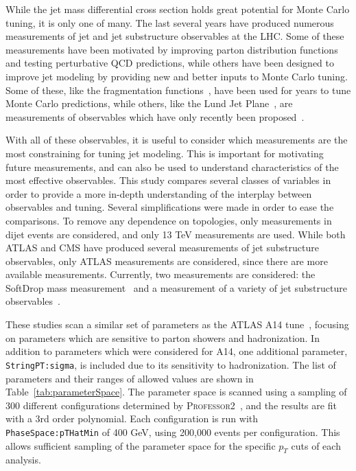 While the jet mass differential cross section holds great potential for Monte Carlo tuning, it is only one of many.  The last several years have produced numerous measurements of jet and jet substructure observables at the LHC. 
Some of these measurements have been motivated by improving parton distribution functions and testing perturbative QCD predictions, 
while others have been designed to improve jet modeling by providing new and better inputs to Monte Carlo tuning.
Some of these, like the fragmentation functions~\cite{Aad:2019onw}, have been used for years to tune Monte Carlo predictions, 
while others, like the Lund Jet Plane~\cite{lundAtlas}, are measurements of observables which have only recently been proposed~\cite{lundPlane}.

With all of these observables, it is useful to consider which measurements are the most constraining for tuning jet modeling.
This is important for motivating future measurements, and can also be used to understand characteristics of the most effective observables.
This study compares several classes of variables in order to provide a more in-depth understanding of the interplay between observables and tuning.
Several simplifications were made in order to ease the comparisons. 
To remove any dependence on topologies, only measurements in dijet events are considered, and only 13 TeV measurements are used.
While both ATLAS and CMS have produced several measurements of jet substructure observables, only ATLAS measurements are considered, since there are more available measurements.
Currently, two measurements are considered: the SoftDrop mass measurement~\cite{Aaboud:2017qwh} and a measurement of a variety of jet substructure observables~\cite{Aaboud:2019aii}.


These studies scan a similar set of parameters as the ATLAS A14 tune~\cite{ATL-PHYS-PUB-2014-021}, focusing on parameters which are sensitive to parton showers and hadronization.
In addition to parameters which were considered for A14, one additional parameter, \texttt{StringPT:sigma}, is included due to its sensitivity to hadronization.
The list of parameters and their ranges of allowed values are shown in Table~\ref{tab:parameterSpace}.
The parameter space is scanned using a sampling of 300 different configurations determined by \textsc{Professor2}~\cite{Buckley:2009bj}, and the results are fit with a 3rd order polynomial.
Each configuration is run with \texttt{PhaseSpace:pTHatMin} of 400 GeV, using 200,000 events per configuration. 
This allows sufficient sampling of the parameter space for the specific $p_{T}$ cuts of each analysis. 

